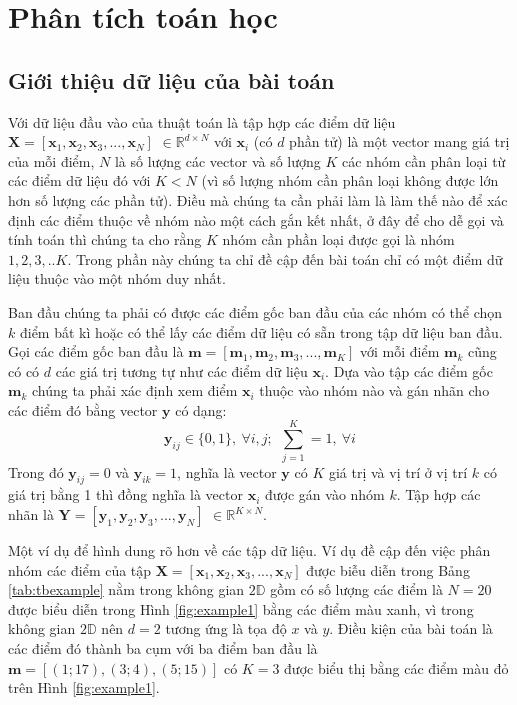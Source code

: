 \documentclass{article}
\begin{document}
	\section{Phân tích toán học} %
	\subsection{Giới thiệu dữ liệu của bài toán}
	\label{sec:phân_tích_toán_học}
	Với dữ liệu đầu vào của thuật toán là tập hợp các điểm dữ liệu $\mathbf{X} = [\mathbf{x}_1,\mathbf{x}_2,\mathbf{x}_3,...,\mathbf{x}_N]$ $\in \mathds{R}^{d\times N}$ với $\mathbf{x}_i$ (có $d$ phần tử) là một vector mang giá trị của mỗi điểm, $N$ là số lượng các vector và số lượng $K$ các nhóm cần phân loại từ các điểm dữ liệu đó với $K < N$ (vì số lượng nhóm cần phân loại không được lớn hơn số lượng các phần tử). Điều mà chúng ta cần phải làm là làm thế nào để xác định các điểm thuộc về nhóm nào một cách gắn kết nhất, ở đây để cho dễ gọi và tính toán thì chúng ta cho rằng $K$ nhóm cần phần loại được gọi là nhóm $1,2,3,..K$. Trong phần này chúng ta chỉ đề cập đến bài toán chỉ có một điểm dữ liệu thuộc vào một nhóm duy nhất.\par
	Ban đầu chúng ta phải có được các điểm gốc ban đầu của các nhóm có thể chọn $k$ điểm bất kì hoặc có thể lấy các điểm dữ liệu có sẵn trong tập dữ liệu ban đầu. Gọi các điểm gốc ban đầu là $\mathbf{m} = [\mathbf{m}_1,\mathbf{m}_2,\mathbf{m}_3,...,\mathbf{m}_K]$ với mỗi điểm $\mathbf{m}_k$ cũng có có $d$ các giá trị tương tự như các điểm dữ liệu $\mathbf{x}_i$. Dựa vào tập các điểm gốc $\mathbf{m}_k$ chúng ta phải xác định xem điểm $\mathbf{x}_i$ thuộc vào nhóm nào và gán nhãn cho các điểm đó bằng vector $\mathbf{y}$ có dạng:
	$$\mathbf{y}_{ij} \in \{0,1\},\ \forall i,j;\ \  \sum_{j = 1}^{K} = 1,\  \forall i$$
	Trong đó $\mathbf{y}_{ij} = 0$ và $\mathbf{y}_{ik} = 1$, nghĩa là vector $\mathbf{y}$ có $K$ giá trị và vị trí ở vị trí $k$ có giá trị bằng 1 thì đồng nghĩa là vector $\mathbf{x}_i$ được gán vào nhóm $k$. Tập hợp các nhãn là $\mathbf{Y} = [\mathbf{y}_1,\mathbf{y}_2,\mathbf{y}_3,...,\mathbf{y}_N]$ $\in \mathds{R}^{K\times N}$.\par
	Một ví dụ để hình dung rõ hơn về các tập dữ liệu. Ví dụ đề cập đến việc phân nhóm các điểm của tập $\mathbf{X} = [\mathbf{x}_1,\mathbf{x}_2,\mathbf{x}_3,...,\mathbf{x}_N]$ được biễu diễn trong Bảng \ref{tab:tbexample} nằm trong  không gian $2\mathds{D}$ gồm có số lượng các điểm là $N = 20$ được biểu diễn trong Hình \ref{fig:example1} bằng các điểm màu xanh, vì trong không gian $2\mathds{D}$ nên $d = 2$ tương ứng là tọa độ $x$ và $y$. Điều kiện của bài toán là các điểm đó thành ba cụm với ba điểm ban đầu là $\mathbf{m} = [(1;17),(3;4),(5;15)]$ có $K = 3$ được biểu thị bằng các điểm màu đỏ trên Hình \ref{fig:example1}.
\end{document}
